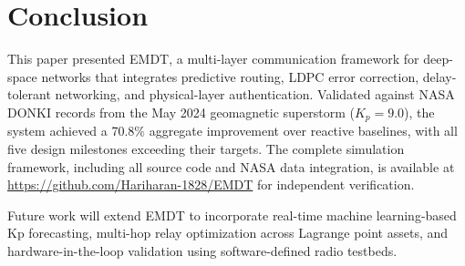 \documentclass[journal]{IEEEtran}
\begin{document}

\section{Conclusion}
This paper presented EMDT, a multi-layer communication framework for deep-space networks that integrates predictive routing, LDPC error correction, delay-tolerant networking, and physical-layer authentication.
Validated against NASA DONKI records from the May 2024 geomagnetic superstorm ($K_p = 9.0$), the system achieved a 70.8\% aggregate improvement over reactive baselines, with all five design milestones exceeding their targets.
The complete simulation framework, including all source code and NASA data integration, is available at \url{https://github.com/Hariharan-1828/EMDT} for independent verification.

Future work will extend EMDT to incorporate real-time machine learning-based Kp forecasting, multi-hop relay optimization across Lagrange point assets, and hardware-in-the-loop validation using software-defined radio testbeds.



\end{document}

